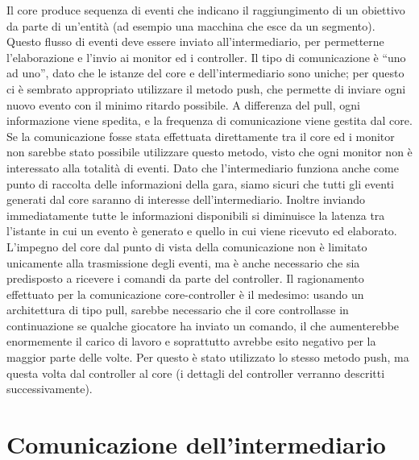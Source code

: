 Il core produce sequenza di eventi che indicano il raggiungimento di un obiettivo da parte di un’entità (ad esempio una macchina che esce da un segmento).
Questo flusso di eventi deve essere inviato all’intermediario, per permetterne l’elaborazione e l’invio ai monitor ed i controller.
Il tipo di comunicazione è “uno ad uno”, dato che le istanze del core e dell’intermediario sono uniche; per questo ci è sembrato appropriato utilizzare il metodo push, che permette di inviare ogni nuovo evento con il minimo ritardo possibile.
A differenza del pull, ogni informazione viene spedita, e la frequenza di comunicazione viene gestita dal core. Se la comunicazione fosse stata effettuata direttamente tra il core ed i monitor non sarebbe stato possibile utilizzare questo metodo, visto che ogni monitor non è interessato alla totalità di eventi. Dato che l’intermediario funziona anche come punto di raccolta delle informazioni della gara, siamo sicuri che tutti gli eventi generati dal core saranno di interesse dell’intermediario. Inoltre inviando immediatamente tutte le informazioni disponibili si diminuisce la latenza tra l’istante in cui un evento è generato e quello in cui viene ricevuto ed elaborato.
L’impegno del core dal punto di vista della comunicazione non è limitato unicamente alla trasmissione degli eventi, ma è anche necessario che sia predisposto a ricevere i comandi da parte del controller. Il ragionamento effettuato per la comunicazione core-controller è il medesimo: usando un architettura di tipo pull, sarebbe necessario che il core controllasse in continuazione se qualche giocatore ha inviato un comando, il che aumenterebbe enormemente il carico di lavoro e soprattutto avrebbe esito negativo per la maggior parte delle volte. Per questo è stato utilizzato lo stesso metodo push, ma questa volta dal controller al core (i dettagli del controller verranno descritti successivamente).


\section{Comunicazione dell’intermediario}

